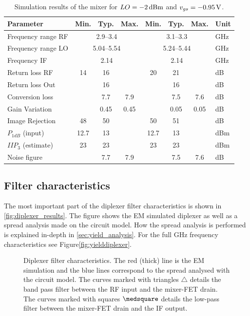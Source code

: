 			\begin{table}[hbt!]
				\caption[Simulation result of the mixer.]{Simulation results of the mixer for $LO=\unit[-2]{dBm}$ and $v_{gs}=\unit[-0.95]{V}$.\disclaimer}
				\label{tab:resultmixer}
				\centering
				\begin{tabular}{ l c c c c c c l } \toprule
					Parameter & Min. & Typ. & Max. & Min. & Typ. & Max. & Unit \\\midrule
					Frequency range RF & \multicolumn{3}{c}{2.9--3.4} & \multicolumn{3}{c}{3.1--3.3} & GHz \\
					Frequency range LO & \multicolumn{3}{c}{5.04--5.54} & \multicolumn{3}{c}{5.24--5.44} & GHz \\
					Frequency IF & \multicolumn{3}{c}{2.14} & \multicolumn{3}{c}{2.14} & GHz \\
					Return loss RF & 14 & 16 &  & 20 & 21 &  & dB \\
					Return loss Out & & 16 & & & 16 & & dB \\
					Conversion loss &  & 7.7 & 7.9 &  & 7.5 & 7.6 & dB \\
					Gain Variation & & 0.45 & 0.45 & & 0.05 & 0.05 & dB \\
					Image Rejection & 48 & 50 &  & 50 & 51 &  &  dB \\
					$P_{1dB}$ (input) & 12.7 & 13 &  & 12.7 & 13 &  & dBm \\
					$IIP_3$ (estimate) & 23 & 23 &  & 23 & 23 &  & dBm \\
					Noise figure &  & 7.7 & 7.9 &  & 7.5 & 7.6 & dB \\\bottomrule
				\end{tabular}
			\end{table}

		\subsection{Filter characteristics}
			The most important part of the diplexer filter characteristics is shown in \autoref{fig:diplexer_results}. The figure shows the EM simulated diplexer as well as a spread analysis made on the circuit model. How the spread analysis is performed is explained in-depth in \autoref{sec:yield_analysis}. For the full \unit[0--10]{GHz} frequency characteristics see Figure\autoref{fig:yielddiplexer}.

			\begin{figure}[hbt!]
				\centering
				\caption[Diplexer filter characteristics.]{Diplexer filter characteristics. The red (thick) line is the EM simulation and the blue lines correspond to the spread analysed with the circuit model. The curves marked with triangles $\triangle$ details the band pass filter between the RF input and the mixer-FET drain. The curves marked with squares $\medsquare$ details the low-pass filter between the mixer-FET drain and the IF output.}\label{fig:diplexer_results}
			\end{figure}

